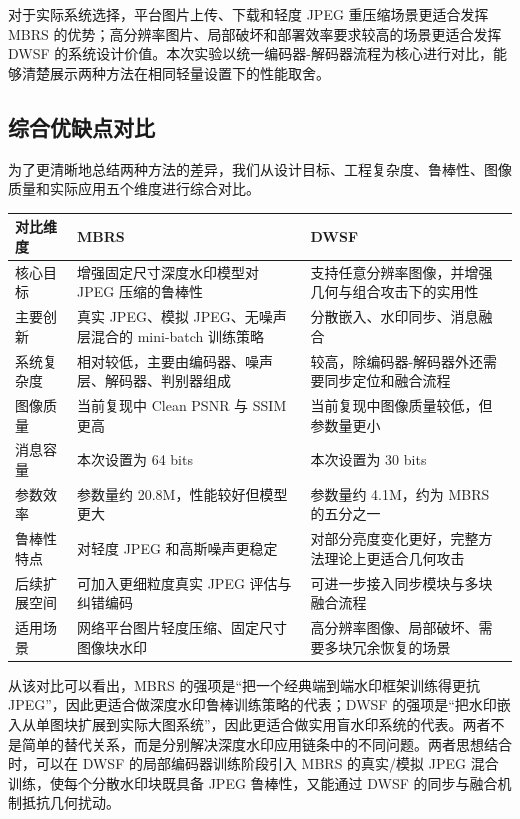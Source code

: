 ﻿\documentclass[UTF8,zihao=5]{ctexart}
\begin{document}
对于实际系统选择，平台图片上传、下载和轻度 JPEG 重压缩场景更适合发挥 MBRS 的优势；高分辨率图片、局部破坏和部署效率要求较高的场景更适合发挥 DWSF 的系统设计价值。本次实验以统一编码器-解码器流程为核心进行对比，能够清楚展示两种方法在相同轻量设置下的性能取舍。

\subsection{综合优缺点对比}

为了更清晰地总结两种方法的差异，我们从设计目标、工程复杂度、鲁棒性、图像质量和实际应用五个维度进行综合对比。

\begin{table}[H]
\centering
\footnotesize
\setlength{\tabcolsep}{4pt}
\begin{tabular}{p{}p{}p{}}
\toprule
对比维度 & MBRS & DWSF \\
\midrule
核心目标 & 增强固定尺寸深度水印模型对 JPEG 压缩的鲁棒性 & 支持任意分辨率图像，并增强几何与组合攻击下的实用性 \\
主要创新 & 真实 JPEG、模拟 JPEG、无噪声层混合的 mini-batch 训练策略 & 分散嵌入、水印同步、消息融合 \\
系统复杂度 & 相对较低，主要由编码器、噪声层、解码器、判别器组成 & 较高，除编码器-解码器外还需要同步定位和融合流程 \\
图像质量 & 当前复现中 Clean PSNR 与 SSIM 更高 & 当前复现中图像质量较低，但参数量更小 \\
消息容量 & 本次设置为 64 bits & 本次设置为 30 bits \\
参数效率 & 参数量约 20.8M，性能较好但模型更大 & 参数量约 4.1M，约为 MBRS 的五分之一 \\
鲁棒性特点 & 对轻度 JPEG 和高斯噪声更稳定 & 对部分亮度变化更好，完整方法理论上更适合几何攻击 \\
后续扩展空间 & 可加入更细粒度真实 JPEG 评估与纠错编码 & 可进一步接入同步模块与多块融合流程 \\
适用场景 & 网络平台图片轻度压缩、固定尺寸图像块水印 & 高分辨率图像、局部破坏、需要多块冗余恢复的场景 \\
\bottomrule
\end{tabular}
\end{table}

从该对比可以看出，MBRS 的强项是“把一个经典端到端水印框架训练得更抗 JPEG”，因此更适合做深度水印鲁棒训练策略的代表；DWSF 的强项是“把水印嵌入从单图块扩展到实际大图系统”，因此更适合做实用盲水印系统的代表。两者不是简单的替代关系，而是分别解决深度水印应用链条中的不同问题。两者思想结合时，可以在 DWSF 的局部编码器训练阶段引入 MBRS 的真实/模拟 JPEG 混合训练，使每个分散水印块既具备 JPEG 鲁棒性，又能通过 DWSF 的同步与融合机制抵抗几何扰动。
\end{document}
